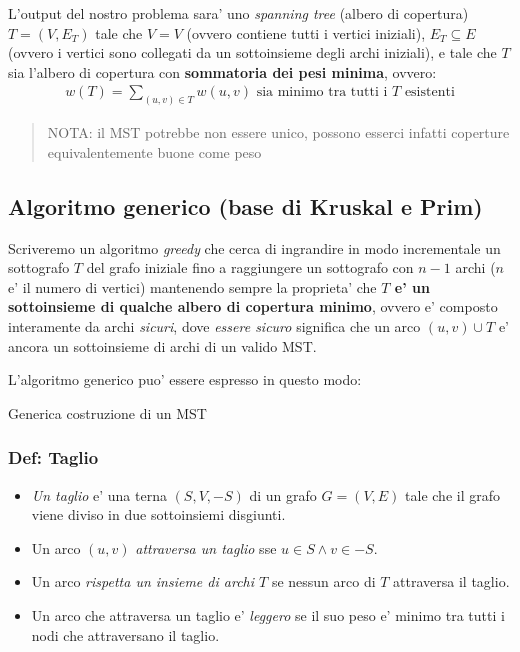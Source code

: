 \documentclass{article}
\begin{document}
L'output del nostro problema sara' uno \emph{spanning tree} (albero di copertura)
$T = (V, E_T)$ tale che $V = V$ (ovvero contiene tutti i vertici iniziali),
$E_T \subseteq E$ (ovvero i vertici sono collegati da un sottoinsieme degli
archi iniziali), e tale che $T$ sia l'albero di copertura con \textbf{sommatoria
dei pesi minima}, ovvero:
\begin{align*}
  w(T) = \sum_{(u, v) \in T} w(u, v) \text{ sia minimo tra tutti i } T \text{ esistenti}
\end{align*}

\begin{quote}
  NOTA: il MST potrebbe non essere unico, possono esserci infatti coperture
  equivalentemente buone come peso
\end{quote}

\subsection{Algoritmo generico (base di Kruskal e Prim)}

Scriveremo un algoritmo \emph{greedy} che cerca di ingrandire in modo
incrementale un sottografo $T$ del grafo iniziale fino a raggiungere un sottografo
con $n-1$ archi ($n$ e' il numero di vertici) mantenendo sempre la proprieta' che
\textbf{$T$ e' un sottoinsieme di qualche albero di copertura minimo}, ovvero
e' composto interamente da archi \emph{sicuri}, dove \emph{essere sicuro} significa
che un arco $(u, v) \cup T$ e' ancora un sottoinsieme di archi di un valido MST.

L'algoritmo generico puo' essere espresso in questo modo:

\begin{algorithm}[H]
  \caption{Generica costruzione di un MST}
\end{algorithm}

\subsubsection{Def: Taglio}

\begin{itemize}
  \item \emph{Un taglio} e' una terna $(S, V, -S)$ di un grafo $G = (V, E)$ tale
    che il grafo viene diviso in due sottoinsiemi disgiunti.
  \item Un arco $(u, v)$ \emph{attraversa un taglio} sse $u \in S \wedge v \in -S$.
  \item Un arco \emph{rispetta un insieme di archi $T$} se nessun arco di $T$
    attraversa il taglio.
  \item Un arco che attraversa un taglio e' \emph{leggero} se il suo peso e'
    minimo tra tutti i nodi che attraversano il taglio.
\end{itemize}
\end{document}
